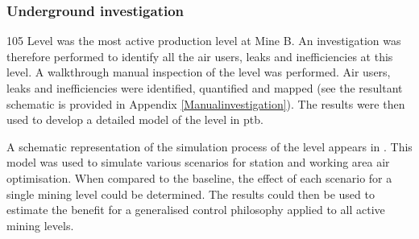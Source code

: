 	\subsubsection{Underground investigation}
	105 Level was the most active production level at Mine B. An investigation was therefore performed to identify all the air users, leaks and inefficiencies at this level. A walkthrough manual inspection of the level was performed. Air users, leaks and inefficiencies were identified, quantified and mapped (see the resultant schematic is provided in Appendix \ref{Manualinvestigation}). The results were then used to develop a detailed model of the level in \gls{ptb}. 
	\par 
	A schematic representation of the simulation process of the level appears in . This model was used to simulate various scenarios for station and working area air optimisation. When compared to the baseline, the effect of each scenario for a single mining level could be determined. The results could then be used to estimate the benefit for a generalised control philosophy applied to all active mining levels.
